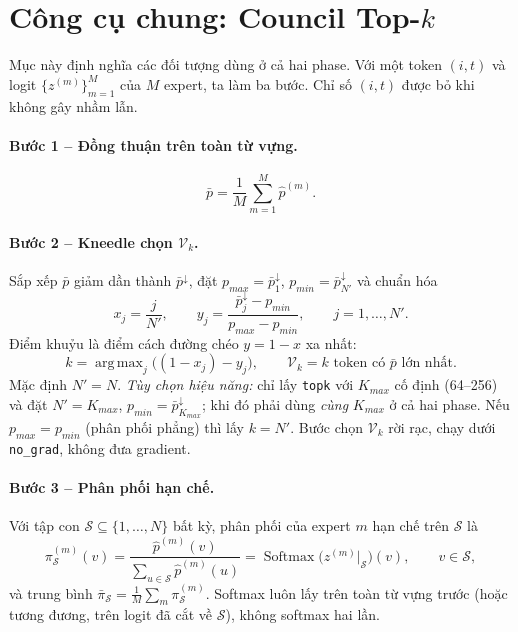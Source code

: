 \documentclass[12pt,a4paper]{article}
\theoremstyle{plain}
\DeclareMathOperator*{\argmax}{arg\,max}
\DeclareMathOperator{\Softmax}{Softmax}
\newcommand{\Vk}{\mathcal V_k}
\begin{document}
\section{Công cụ chung: Council Top-$k$}
\label{sec:topk}

Mục này định nghĩa các đối tượng dùng ở cả hai phase. Với một token $(i,t)$ và logit $\{z^{(m)}\}_{m=1}^M$ của $M$ expert, ta làm ba bước. Chỉ số $(i,t)$ được bỏ khi không gây nhầm lẫn.

\paragraph{Bước 1 -- Đồng thuận trên toàn từ vựng.}
\begin{equation}
\label{eq:pbar}
\bar p=\frac1M\sum_{m=1}^M\hat p^{(m)}.
\end{equation}

\paragraph{Bước 2 -- Kneedle chọn $\Vk$.}
Sắp xếp $\bar p$ giảm dần thành $\bar p^\downarrow$, đặt $p_{max}=\bar p^\downarrow_1$, $p_{min}=\bar p^\downarrow_{N'}$ và chuẩn hóa
\begin{equation}
x_j=\frac{j}{N'},\qquad y_j=\frac{\bar p^\downarrow_j-p_{min}}{p_{max}-p_{min}},\qquad j=1,\dots,N'.
\end{equation}
Điểm khuỷu là điểm cách đường chéo $y=1-x$ xa nhất:
\begin{equation}
\label{eq:kneedle}
k=\argmax_{j}\big((1-x_j)-y_j\big),\qquad \Vk=\text{$k$ token có $\bar p$ lớn nhất}.
\end{equation}
Mặc định $N'=N$. \emph{Tùy chọn hiệu năng:} chỉ lấy \texttt{topk} với $K_{max}$ cố định (64--256) và đặt $N'=K_{max}$, $p_{min}=\bar p^\downarrow_{K_{max}}$; khi đó phải dùng \emph{cùng} $K_{max}$ ở cả hai phase. Nếu $p_{max}=p_{min}$ (phân phối phẳng) thì lấy $k=N'$. Bước chọn $\Vk$ rời rạc, chạy dưới \texttt{no\_grad}, không đưa gradient.

\paragraph{Bước 3 -- Phân phối hạn chế.}
Với tập con $\mathcal S\subseteq\{1,\dots,N\}$ bất kỳ, phân phối của expert $m$ hạn chế trên $\mathcal S$ là
\begin{equation}
\label{eq:restrict}
\pi^{(m)}_{\mathcal S}(v)=\frac{\hat p^{(m)}(v)}{\sum_{u\in\mathcal S}\hat p^{(m)}(u)}=\Softmax\!\big(z^{(m)}\big|_{\mathcal S}\big)(v),\qquad v\in\mathcal S,
\end{equation}
và trung bình $\bar\pi_{\mathcal S}=\frac1M\sum_m\pi^{(m)}_{\mathcal S}$. Softmax luôn lấy trên toàn từ vựng trước (hoặc tương đương, trên logit đã cắt về $\mathcal S$), không softmax hai lần.
\end{document}
